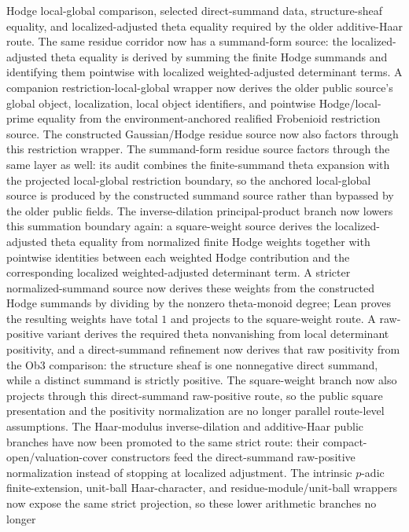 \documentclass[11pt]{article}
\theoremstyle{plain}
\theoremstyle{definition}
\theoremstyle{remark}
\begin{document}
  Hodge local-global comparison, selected direct-summand data, structure-sheaf
  equality, and localized-adjusted theta equality required by the older
  additive-Haar route.  The same residue corridor now has a summand-form
  source: the localized-adjusted theta equality is derived by summing the
  finite Hodge summands and identifying them pointwise with localized
  weighted-adjusted determinant terms.  A companion restriction-local-global
  wrapper now derives the older public source's global object, localization,
  local object identifiers, and pointwise Hodge/local-prime equality from the
  environment-anchored realified Frobenioid restriction source.  The
  constructed Gaussian/Hodge residue source now also factors through this
  restriction wrapper.  The summand-form residue source factors through the
  same layer as well: its audit combines the finite-summand theta expansion
  with the projected local-global restriction boundary, so the anchored
  local-global source is produced by the constructed summand source rather
  than bypassed by the older public fields.
  The inverse-dilation principal-product branch now lowers this summation
  boundary again: a square-weight source derives the localized-adjusted theta
  equality from normalized finite Hodge weights together with pointwise
  identities between each weighted Hodge contribution and the corresponding
  localized weighted-adjusted determinant term.  A stricter normalized-summand
  source now derives these weights from the constructed Hodge summands by
  dividing by the nonzero theta-monoid degree; Lean proves the resulting
  weights have total \(1\) and projects to the square-weight route.  A
  raw-positive variant derives the required theta nonvanishing from local
  determinant positivity, and a direct-summand refinement now derives that raw
  positivity from the Ob3 comparison: the structure sheaf is one nonnegative
  direct summand, while a distinct summand is strictly positive.  The
  square-weight branch now also projects through this direct-summand
  raw-positive route, so the public square presentation and the positivity
  normalization are no longer parallel route-level assumptions.  The
  Haar-modulus inverse-dilation and additive-Haar public branches have now
  been promoted to the same strict route: their compact-open/valuation-cover
  constructors feed the direct-summand raw-positive normalization instead of
  stopping at localized adjustment.  The intrinsic \(p\)-adic finite-extension,
  unit-ball Haar-character, and residue-module/unit-ball wrappers now expose
  the same strict projection, so these lower arithmetic branches no longer
\end{document}
